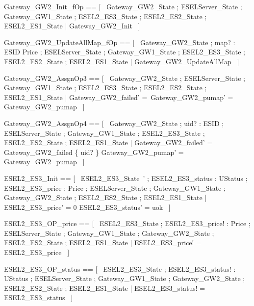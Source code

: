 \documentclass{article}
\begin{document}
\begin{zed}
	Gateway\_GW2\_Init\_fOp == [~  \Xi Gateway\_GW2\_State ; \Xi ESELServer\_State ; \Xi Gateway\_GW1\_State ; \Xi ESEL2\_ES3\_State ; \Xi ESEL2\_ES2\_State ; \Xi ESEL2\_ES1\_State | \lnot \pre Gateway\_GW2\_Init  ~]
\end{zed}

\begin{zed}
	Gateway\_GW2\_UpdateAllMap\_fOp == [~  \Xi Gateway\_GW2\_State ; map? : ESID \pfun Price ; \Xi ESELServer\_State ; \Xi Gateway\_GW1\_State ; \Xi ESEL2\_ES3\_State ; \Xi ESEL2\_ES2\_State ; \Xi ESEL2\_ES1\_State | \lnot \pre Gateway\_GW2\_UpdateAllMap  ~]
\end{zed}

\begin{zed}
	Gateway\_GW2\_AssgnOp3 == [~  \Delta Gateway\_GW2\_State ; \Xi ESELServer\_State ; \Xi Gateway\_GW1\_State ; \Xi ESEL2\_ES3\_State ; \Xi ESEL2\_ES2\_State ; \Xi ESEL2\_ES1\_State | Gateway\_GW2\_failed' =~\emptyset \land Gateway\_GW2\_pumap' = Gateway\_GW2\_pumap  ~]
\end{zed}

\begin{zed}
	Gateway\_GW2\_AssgnOp4 == [~  \Delta Gateway\_GW2\_State ; uid? : ESID ; \Xi ESELServer\_State ; \Xi Gateway\_GW1\_State ; \Xi ESEL2\_ES3\_State ; \Xi ESEL2\_ES2\_State ; \Xi ESEL2\_ES1\_State | Gateway\_GW2\_failed' = Gateway\_GW2\_failed \cup \{ uid? \} \land Gateway\_GW2\_pumap' = Gateway\_GW2\_pumap  ~]
\end{zed}

\begin{zed}
	ESEL2\_ES3\_Init == [~  ESEL2\_ES3\_State~' ; ESEL2\_ES3\_status : UStatus ; ESEL2\_ES3\_price : Price ; \Xi ESELServer\_State ; \Xi Gateway\_GW1\_State ; \Xi Gateway\_GW2\_State ; \Xi ESEL2\_ES2\_State ; \Xi ESEL2\_ES1\_State | ESEL2\_ES3\_price' = 0 \land ESEL2\_ES3\_status' = uok  ~]
\end{zed}

\begin{zed}
	ESEL2\_ES3\_OP\_price == [~  \Xi ESEL2\_ES3\_State ; ESEL2\_ES3\_price! : Price ; \Xi ESELServer\_State ; \Xi Gateway\_GW1\_State ; \Xi Gateway\_GW2\_State ; \Xi ESEL2\_ES2\_State ; \Xi ESEL2\_ES1\_State | ESEL2\_ES3\_price! = ESEL2\_ES3\_price  ~]
\end{zed}

\begin{zed}
	ESEL2\_ES3\_OP\_status == [~  \Xi ESEL2\_ES3\_State ; ESEL2\_ES3\_status! : UStatus ; \Xi ESELServer\_State ; \Xi Gateway\_GW1\_State ; \Xi Gateway\_GW2\_State ; \Xi ESEL2\_ES2\_State ; \Xi ESEL2\_ES1\_State | ESEL2\_ES3\_status! = ESEL2\_ES3\_status  ~]
\end{zed}
\end{document}
